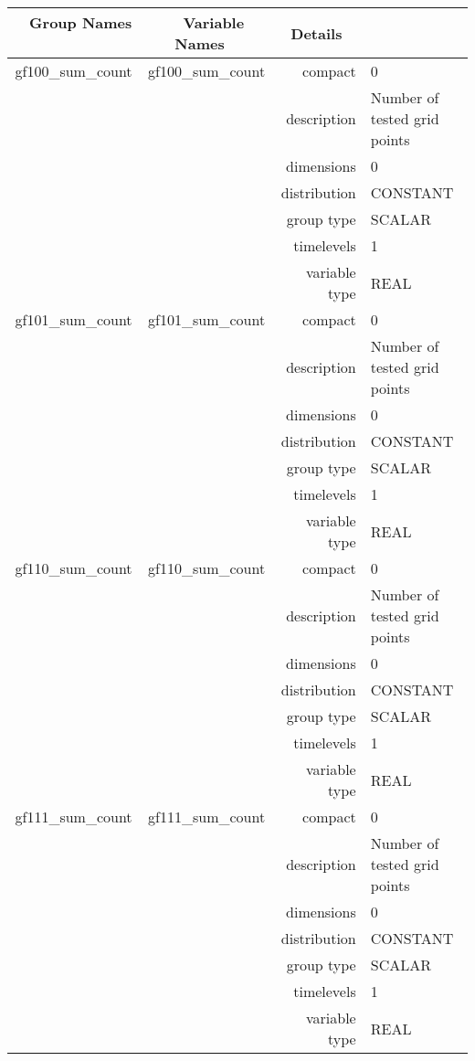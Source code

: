 \begin{tabular*}{150mm}{|c|c@{\extracolsep{\fill}}|rl|} \hline 
~ {\bf Group Names} ~ & ~ {\bf Variable Names} ~  &{\bf Details} ~ & ~ \\ 
\hline 
gf100\_sum\_count & gf100\_sum\_count & compact & 0 \\ 
 &  & description & Number of tested grid points \\ 
 &  & dimensions & 0 \\ 
 &  & distribution & CONSTANT \\ 
 &  & group type & SCALAR \\ 
 &  & timelevels & 1 \\ 
 &  & variable type & REAL \\ 
\hline 
gf101\_sum\_count & gf101\_sum\_count & compact & 0 \\ 
 &  & description & Number of tested grid points \\ 
 &  & dimensions & 0 \\ 
 &  & distribution & CONSTANT \\ 
 &  & group type & SCALAR \\ 
 &  & timelevels & 1 \\ 
 &  & variable type & REAL \\ 
\hline 
gf110\_sum\_count & gf110\_sum\_count & compact & 0 \\ 
 &  & description & Number of tested grid points \\ 
 &  & dimensions & 0 \\ 
 &  & distribution & CONSTANT \\ 
 &  & group type & SCALAR \\ 
 &  & timelevels & 1 \\ 
 &  & variable type & REAL \\ 
\hline 
gf111\_sum\_count & gf111\_sum\_count & compact & 0 \\ 
 &  & description & Number of tested grid points \\ 
 &  & dimensions & 0 \\ 
 &  & distribution & CONSTANT \\ 
 &  & group type & SCALAR \\ 
 &  & timelevels & 1 \\ 
 &  & variable type & REAL \\ 
\hline 
\end{tabular*} 



\vspace{5mm}

